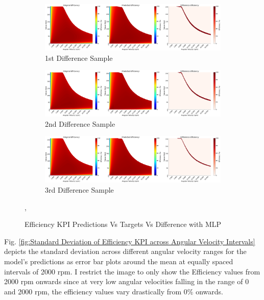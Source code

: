 \documentclass{report} %
\begin{document}
\begin{figure}[H]
    \centering
    \begin{subfigure}{1\textwidth}
        \centering
        \includegraphics[width=1\textwidth]{./ReportImages/evalkpi3dprediction1.png} 
        \caption{1st Difference Sample} 
        \label{fig:1st Difference Sample}
    \end{subfigure}\hfill
    \begin{subfigure}{1\textwidth}
        \centering
        \includegraphics[width=1\textwidth]{./ReportImages/evalkpi3dprediction2.png} 
        \caption{2nd Difference Sample} 
        \label{fig:2nd Difference Sample}
    \end{subfigure}\hfill
    \begin{subfigure}{1\textwidth}
        \centering
        \includegraphics[width=1\textwidth]{./ReportImages/evalkpi3dprediction3.png} 
        \caption{3rd Difference Sample} 
        \label{fig:3rd Difference Sample}
    \end{subfigure}
    \caption{Efficiency \ac{KPI} Predictions Vs Targets Vs Difference with \ac{MLP}},
    \label{fig:Efficiency KPI Predictions Vs Targets Vs Difference with MLP}
\end{figure} 

Fig. \ref{fig:Standard Deviation of Efficiency KPI across Angular Velocity Intervals} depicts the standard deviation across different 
angular velocity ranges for the model's predictions as error bar plots around the mean at equally spaced intervals of 2000 rpm.
I restrict the image to only show the Efficiency values from 2000 rpm onwards since at very low angular velocities falling in the range of 0 and 2000 rpm, the efficiency 
values vary drastically from 0\% onwards.
\end{document}
